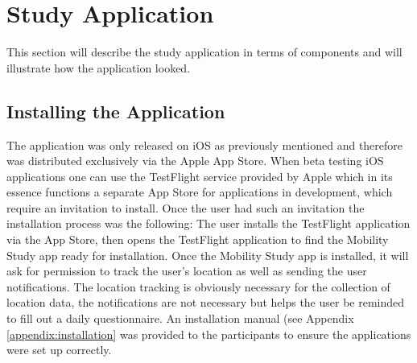 \section{Study Application}
This section will describe the study application in terms of components and will illustrate how the application looked.

\subsection{Installing the Application}
The application was only released on iOS as previously mentioned and therefore was distributed exclusively via the Apple App Store. When beta testing iOS applications one can use the TestFlight service provided by Apple which in its essence functions a separate App Store for applications in development, which require an invitation to install. Once the user had such an invitation the installation process was the following: The user installs the TestFlight application via the App Store, then opens the TestFlight application to find the Mobility Study app ready for installation. Once the Mobility Study app is installed, it will ask for permission to track the user's location as well as sending the user notifications. The location tracking is obviously necessary for the collection of location data, the notifications are not necessary but helps the user be reminded to fill out a daily questionnaire. An installation manual (see Appendix \ref{appendix:installation} was provided to the participants to ensure the applications were set up correctly.

